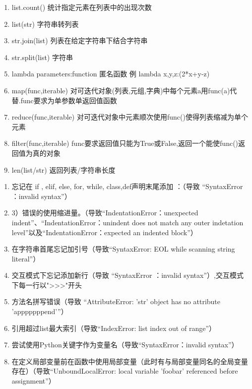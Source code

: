 \documentclass[12pt,a4paper]{article}
\begin{document}
\begin{enumerate}
\item list.count()  统计指定元素在列表中的出现次数

\item list(str)  字符串转列表

\item str.join(list) 列表在给定字符串下结合字符串

\item str.split(list)  字符串

\item lambda parameters:function 匿名函数 例  lambda x,y,z:(2*x+y-z)

\item map(func,iterable)  对可迭代对象(列表,元组,字典)中每个元素a用func(a)代替.func要求为单参数单返回值函数

\item reduce(func,iterable)  对可迭代对象中元素顺次使用func()使得列表缩减为单个元素

\item filter(func,iterable)  func要求返回值只能为True或False,返回一个能使func()返回值为真的对象

\item len(list/str)  返回列表/字符串长度

\end{enumerate}

\vspace{5cm}

\begin{enumerate}
\item 忘记在 if , elif, else, for, while, class,def声明末尾添加 ：（导致 “SyntaxError ：invalid syntax”）
\item 3）错误的使用缩进量。（导致“IndentationError：unexpected indent”、“IndentationError：unindent does not match any outer indetation level”以及“IndentationError：expected an indented block”）
\item  在字符串首尾忘记加引号（导致“SyntaxError: EOL while scanning string literal”）
\item  交互模式下忘记添加新行（导致 “SyntaxError ：invalid syntax”）,交互模式下每一行以">>>"开头
\item  方法名拼写错误（导致 “AttributeError: 'str' object has no attribute 'apppppppend'”）
\item  引用超过list最大索引（导致“IndexError: list index out of range”）
\item  尝试使用Python关键字作为变量名（导致“SyntaxError：invalid syntax”）
\item  在定义局部变量前在函数中使用局部变量（此时有与局部变量同名的全局变量存在）（导致“UnboundLocalError: local variable 'foobar' referenced before assignment”）

\end{enumerate}

    
\end{document}
